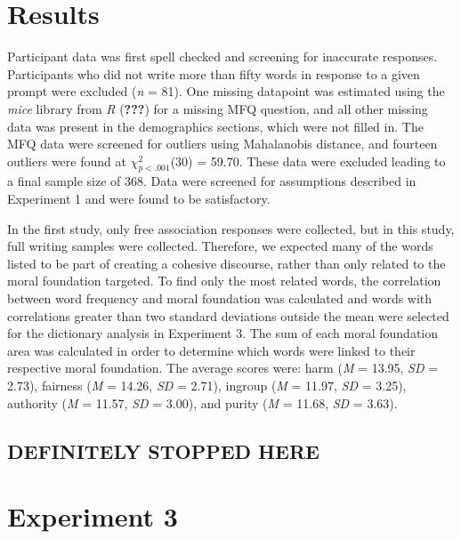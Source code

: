 \documentclass[english,man]{apa6}
\theoremstyle{definition}
\theoremstyle{definition}
\theoremstyle{definition}
\theoremstyle{remark}
\begin{document}
\section{Results}\label{results-1}

Participant data was first spell checked and screening for inaccurate
responses. Participants who did not write more than fifty words in
response to a given prompt were excluded (\emph{n} = 81). One missing
datapoint was estimated using the \emph{mice} library from \emph{R}
({\textbf{???}}) for a missing MFQ question, and all other missing data
was present in the demographics sections, which were not filled in. The
MFQ data were screened for outliers using Mahalanobis distance, and
fourteen outliers were found at \(\chi^2_{p<.001}\)(30) = 59.70. These
data were excluded leading to a final sample size of 368. Data were
screened for assumptions described in Experiment 1 and were found to be
satisfactory.

In the first study, only free association responses were collected, but
in this study, full writing samples were collected. Therefore, we
expected many of the words listed to be part of creating a cohesive
discourse, rather than only related to the moral foundation targeted. To
find only the most related words, the correlation between word frequency
and moral foundation was calculated and words with correlations greater
than two standard deviations outside the mean were selected for the
dictionary analysis in Experiment 3. The sum of each moral foundation
area was calculated in order to determine which words were linked to
their respective moral foundation. The average scores were: harm
(\emph{M} = 13.95, \emph{SD} = 2.73), fairness (\emph{M} = 14.26,
\emph{SD} = 2.71), ingroup (\emph{M} = 11.97, \emph{SD} = 3.25),
authority (\emph{M} = 11.57, \emph{SD} = 3.00), and purity (\emph{M} =
11.68, \emph{SD} = 3.63).

\subsection{DEFINITELY STOPPED HERE}\label{definitely-stopped-here}

\section{Experiment 3}\label{experiment-3}
\end{document}
